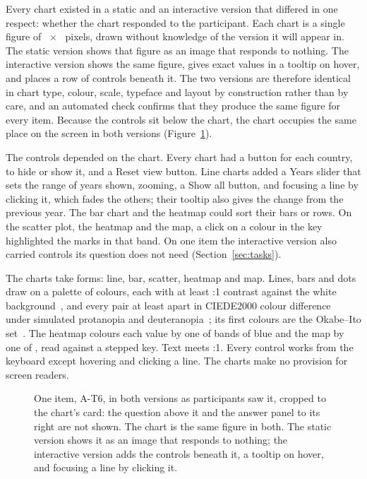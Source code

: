 \documentclass[10pt,twocolumn]{article}
\begin{document}
Every chart existed in a static and an interactive version that differed in one respect: whether the chart responded to the participant. Each chart is a single figure of ~$\times$~ pixels, drawn without knowledge of the version it will appear in. The static version shows that figure as an image that responds to nothing. The interactive version shows the same figure, gives exact values in a tooltip on hover, and places a row of controls beneath it. The two versions are therefore identical in chart type, colour, scale, typeface and layout by construction rather than by care, and an automated check confirms that they produce the same figure for every item. Because the controls sit below the chart, the chart occupies the same place on the screen in both versions (Figure~\ref{fig:versions}).

The controls depended on the chart. Every chart had a button for each country, to hide or show it, and a Reset view button. Line charts added a Years slider that sets the range of years shown, zooming, a Show all button, and focusing a line by clicking it, which fades the others; their tooltip also gives the change from the previous year. The bar chart and the heatmap could sort their bars or rows. On the scatter plot, the heatmap and the map, a click on a colour in the key highlighted the marks in that band. On one item the interactive version also carried  controls its question does not need (Section~\ref{sec:tasks}).

The charts take  forms: line, bar, scatter, heatmap and map. Lines, bars and dots draw on a palette of  colours, each with at least :1 contrast against the white background~\cite{w3c2018wcag21}, and every pair at least  apart in CIEDE2000 colour difference~\cite{sharma2005} under simulated protanopia and deuteranopia~\cite{machado2009}; its first colours are the Okabe--Ito set~\cite{okabe2008}. The heatmap colours each value by one of  bands of blue and the map by one of , read against a stepped key. Text meets :1. Every control works from the keyboard except hovering and clicking a line. The charts make no provision for screen readers.

\begin{figure}[t]
    \centering
    
    \caption{
        One item, A-T6, in both versions as participants saw it, cropped to the chart's card: the question above it and the answer panel to its right are not shown. The chart is the same figure in both. The static version shows it as an image that responds to nothing; the interactive version adds the controls beneath it, a tooltip on hover, and focusing a line by clicking it.
    }
    \label{fig:versions}
\end{figure}
\end{document}
